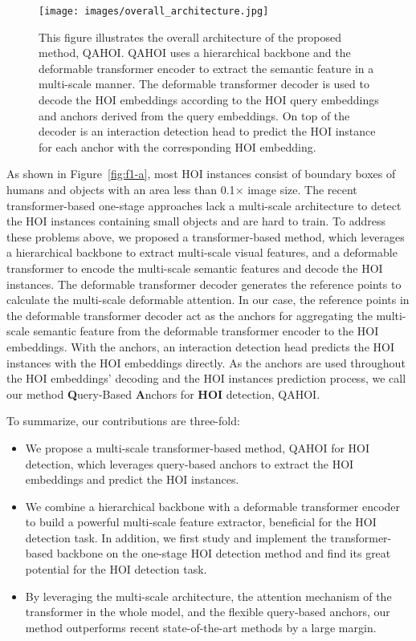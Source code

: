 \documentclass[10pt,twocolumn,letterpaper]{article}
\begin{document}
\begin{figure*}
  \centering
  \texttt{[image: images/overall\_architecture.jpg]}
  \caption{This figure illustrates the overall architecture of the proposed method, QAHOI.
     QAHOI uses a hierarchical backbone and the deformable transformer encoder to extract the semantic feature in a multi-scale manner.
     The deformable transformer decoder is used to decode the HOI embeddings according to the HOI query embeddings and anchors derived from the query embeddings.
     On top of the decoder is an interaction detection head to predict the HOI instance for each anchor with the corresponding HOI embedding.}
  \label{fig:overall}
\end{figure*}
As shown in Figure~\ref{fig:f1-a}, most HOI instances consist of boundary boxes of humans and objects with an area less than 0.1$\times$ image size.
The recent transformer-based one-stage approaches lack a multi-scale architecture to detect the HOI instances containing small objects and are hard to train.
To address these problems above, we proposed a transformer-based method, which leverages a hierarchical backbone to extract multi-scale visual features, and a deformable transformer \cite{zhu2020deformable} to encode the multi-scale semantic features and decode the HOI instances.
The deformable transformer decoder generates the reference points to calculate the multi-scale deformable attention. 
In our case, the reference points in the deformable transformer decoder act as the anchors for aggregating the multi-scale semantic feature from the deformable transformer encoder to the HOI embeddings. With the anchors, an interaction detection head predicts the HOI instances with the HOI embeddings directly.
As the anchors are used throughout the HOI embeddings' decoding and the HOI instances prediction process, we call our method {\bf Q}uery-Based {\bf A}nchors for {\bf HOI} detection, QAHOI.

To summarize, our contributions are three-fold:
\begin{itemize}
  \item We propose a multi-scale transformer-based method, QAHOI for HOI detection, which leverages query-based anchors to extract the HOI embeddings and predict the HOI instances.
  \item We combine a hierarchical backbone with a deformable transformer encoder to build a powerful multi-scale feature extractor, beneficial for the HOI detection task. In addition, we first study and implement the transformer-based backbone on the one-stage HOI detection method and find its great potential for the HOI detection task.
  \item By leveraging the multi-scale architecture, the attention mechanism of the transformer in the whole model, and the flexible query-based anchors, our method outperforms recent state-of-the-art methods by a large margin.
\end{itemize}
\end{document}
